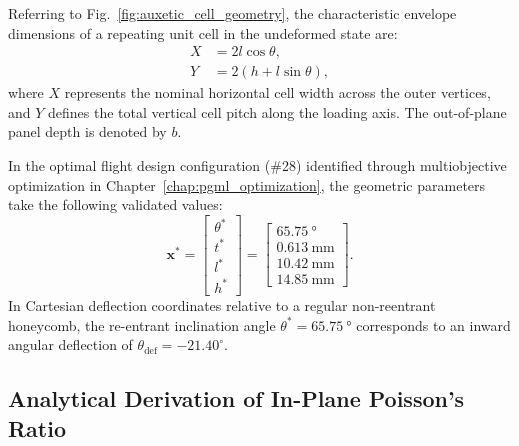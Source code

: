 Referring to Fig.~\ref{fig:auxetic_cell_geometry}, the characteristic envelope dimensions of a repeating unit cell in the undeformed state are:
\begin{align}
X &= 2 l \cos\theta, \label{eq:cell_width} \\
Y &= 2 \left( h + l \sin\theta \right), \label{eq:cell_height}
\end{align}
where $X$ represents the nominal horizontal cell width across the outer vertices, and $Y$ defines the total vertical cell pitch along the loading axis. The out-of-plane panel depth is denoted by $b$.

In the optimal flight design configuration (\#28) identified through multiobjective optimization in Chapter~\ref{chap:pgml_optimization}, the geometric parameters take the following validated values:
\begin{equation}
\mathbf{x}^* = \begin{bmatrix} \theta^* \\ t^* \\ l^* \\ h^* \end{bmatrix} = \begin{bmatrix} \SI{65.75}{\degree} \\ \SI{0.613}{\milli\meter} \\ \SI{10.42}{\milli\meter} \\ \SI{14.85}{\milli\meter} \end{bmatrix}.
\label{eq:optimal_vector}
\end{equation}
In Cartesian deflection coordinates relative to a regular non-reentrant honeycomb, the re-entrant inclination angle $\theta^* = \SI{65.75}{\degree}$ corresponds to an inward angular deflection of $\theta_{\text{def}} = -21.40^\circ$.

\subsection{Analytical Derivation of In-Plane Poisson's Ratio}
\label{subsec:derivation_poisson}

